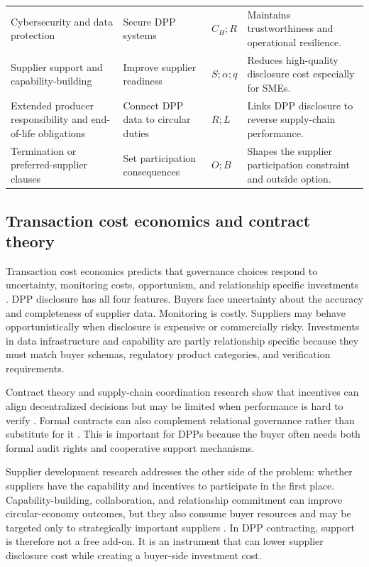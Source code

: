 \documentclass[final,5p,times,authoryear]{elsarticle}
\begin{document}
\begin{table}[t]
\begin{tabular}{@{}p{}p{}p{}p{}@{}}
Cybersecurity and data protection & Secure DPP systems & $C_H; R$ & Maintains trustworthiness and operational resilience. \\
Supplier support and capability-building & Improve supplier readiness & $S; \alpha; q$ & Reduces high-quality disclosure cost especially for SMEs. \\
Extended producer responsibility and end-of-life obligations & Connect DPP data to circular duties & $R; L$ & Links DPP disclosure to reverse supply-chain performance. \\
Termination or preferred-supplier clauses & Set participation consequences & $O; B$ & Shapes the supplier participation constraint and outside option. \\
\bottomrule
\end{tabular}
\endgroup
\end{table}

\subsection{Transaction cost economics and contract theory}

Transaction cost economics predicts that governance choices respond to uncertainty, monitoring costs, opportunism, and relationship specific investments \citep{williamson2008outsourcing}. DPP disclosure has all four features. Buyers face uncertainty about the accuracy and completeness of supplier data. Monitoring is costly. Suppliers may behave opportunistically when disclosure is expensive or commercially risky. Investments in data infrastructure and capability are partly relationship specific because they must match buyer schemas, regulatory product categories, and verification requirements.

Contract theory and supply-chain coordination research show that incentives can align decentralized decisions but may be limited when performance is hard to verify \citep{cachon2003supply,cachon2005supply}. Formal contracts can also complement relational governance rather than substitute for it \citep{poppo2002do,malhotra2011trust}. This is important for DPPs because the buyer often needs both formal audit rights and cooperative support mechanisms.

Supplier development research addresses the other side of the problem: whether suppliers have the capability and incentives to participate in the first place. Capability-building, collaboration, and relationship commitment can improve circular-economy outcomes, but they also consume buyer resources and may be targeted only to strategically important suppliers \citep{doibse3549,doi97813152330004}. In DPP contracting, support is therefore not a free add-on. It is an instrument that can lower supplier disclosure cost while creating a buyer-side investment cost.
\end{document}
